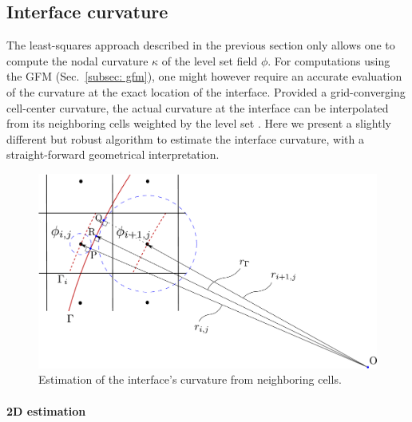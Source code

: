 \subsection{Interface curvature}

The least-squares approach described in the previous section only allows one to compute the nodal curvature $\kappa$ of the level set field $\phi$. For computations using the GFM (Sec.\ \ref{subsec: gfm}), one might however require an accurate evaluation of the curvature at the exact location of the interface. Provided a grid-converging cell-center curvature, the actual curvature at the interface can be interpolated from its neighboring cells weighted by the level set \citep{Francois_JCP_2006, Luo&Hu_JCP_2015}. Here we present a slightly different but robust algorithm to estimate the interface curvature, with a straight-forward geometrical interpretation. 

\begin{figure}[t!]
 \begin{center}
 \includegraphics[width=.75\columnwidth]{Figures/icurv_new.pdf}
 \end{center}
 \caption{Estimation of the interface's curvature from neighboring cells.}
 \label{fig: icurv}
\end{figure}


\paragraph{2D estimation}

